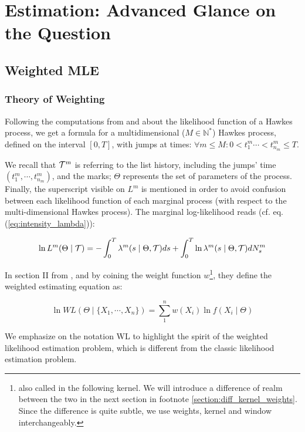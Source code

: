 \chapter{Estimation: Advanced Glance on the Question}
\section{Weighted MLE}
\subsection{Theory of Weighting}
Following the computations from \cite{Ozaki} and \cite{Likelihood_Hawkes} about the likelihood function of a Hawkes process, we get a formula for a multidimensional ($ M \in \mathbb N^*$) Hawkes process, defined on the interval $[0,T]$, with jumps at times: $ \forall m \leq M: 0 < t_{1}^m \cdots < t_{n_m}^m \leq T $.

We recall that $ \mathcal{T}^m $ is referring to the list history, including the jumps' time $( t_{1}^m, \cdots , t_{n_m}^m ) $, and the marks; $\Theta$ represents the set of parameters of the process. Finally, the superscript visible on $L^m$ is mentioned in order to avoid confusion between each likelihood function of each marginal process (with respect to the multi-dimensional Hawkes process). The marginal log-likelihood reads (cf. eq. (\ref{eq:intensity_lambda})):


\begin{equation}
\ln L^m( \Theta \mid \mathcal{T} ) = - \int_0^T \lambda^{m} ( s \mid \Theta , \mathcal{T} ) ds + \int_0^T \ln \lambda^{m}( s \mid \Theta , \mathcal{T} ) d N_s^m \label{eq:log_likelihood}
\end{equation}



In section II from \cite{weighted_likelihood}, and by coining the weight function $w$\footnote{also called in the following kernel. We will introduce a difference of realm between the two in the next section in footnote \ref{section:diff_kernel_weights}. Since the difference is quite subtle, we use weights, kernel and window interchangeably.}, they define the weighted estimating equation as:

\begin{equation}
\ln W L ( \Theta \mid \{ X_1, \cdots, X_n \} ) = \sum_1^n  w(X_i) \ln f( X_i \mid \Theta ) 
\end{equation}

We emphasize on the notation WL to highlight the spirit of the weighted likelihood estimation problem, which is different from the classic likelihood estimation problem.


